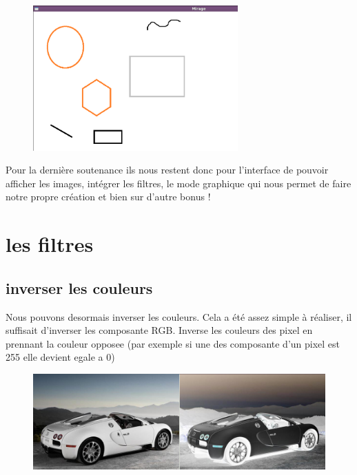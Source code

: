 \documentclass[12pt, a4paper]{report}
\begin{document}
\begin{figure}[!h]
\begin{center} \includegraphics[width=0.7\textwidth]{images/inte.png} \end{center}
\end{figure}

Pour la dernière soutenance ils nous restent donc pour l’interface de pouvoir afficher les images, intégrer les filtres, le mode graphique qui nous permet de faire notre propre création et bien sur d’autre bonus ! 


\newpage

\chapter {les filtres}

\section {inverser les couleurs}

Nous pouvons desormais inverser les couleurs.
Cela a été assez simple à réaliser, il suffisait d'inverser les composante RGB.
Inverse les couleurs des pixel en prennant la couleur opposee (par exemple si une des composante d'un pixel est 255 elle devient egale a 0)

\begin{figure}[!h]
\begin{center} \includegraphics[width=1\textwidth]{images/inverse.png} \end{center}
\end{figure}
\end{document}

